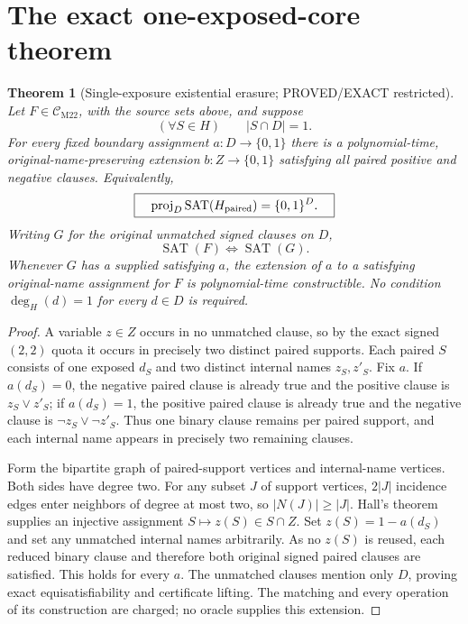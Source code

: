\documentclass[11pt]{article}
\newtheorem{theorem}{Theorem}
\newcommand{\CM}{\mathcal C_{\mathrm{M22}}}
\begin{document}
\section{The exact one-exposed-core theorem}
\begin{theorem}[Single-exposure existential erasure; PROVED/EXACT restricted]
Let $F\in\CM$, with the source sets above, and suppose
\[
(\forall S\in H)\qquad |S\cap D|=1. \tag{E1}
\]
For \emph{every} fixed boundary assignment $a:D\to\{0,1\}$ there is a polynomial-time, original-name-preserving extension $b:Z\to\{0,1\}$ satisfying all paired positive and negative clauses. Equivalently,
\[
\boxed{\quad \operatorname{proj}_{D}\operatorname{SAT}(H_{\rm paired})
             =\{0,1\}^{D}.\quad}
\]
Writing $G$ for the original \emph{unmatched} signed clauses on $D$,
\[
\boxed{\operatorname{SAT}(F)\iff\operatorname{SAT}(G).}
\]
Whenever $G$ has a supplied satisfying $a$, the extension of $a$ to a satisfying original-name assignment for $F$ is polynomial-time constructible. No condition $\deg_H(d)=1$ for every $d\in D$ is required.
\end{theorem}
\begin{proof}
A variable $z\in Z$ occurs in no unmatched clause, so by the exact signed $(2,2)$ quota it occurs in precisely two distinct paired supports. Each paired $S$ consists of one exposed $d_S$ and two distinct internal names $z_S,z'_S$. Fix $a$. If $a(d_S)=0$, the negative paired clause is already true and the positive clause is $z_S\vee z'_S$; if $a(d_S)=1$, the positive paired clause is already true and the negative clause is $\neg z_S\vee\neg z'_S$. Thus one binary clause remains per paired support, and each internal name appears in precisely two remaining clauses.

Form the bipartite graph of paired-support vertices and internal-name vertices. Both sides have degree two. For any subset $J$ of support vertices, $2|J|$ incidence edges enter neighbors of degree at most two, so $|N(J)|\ge |J|$. Hall's theorem supplies an injective assignment $S\mapsto z(S)\in S\cap Z$. Set $z(S)=1-a(d_S)$ and set any unmatched internal names arbitrarily. As no $z(S)$ is reused, each reduced binary clause and therefore both original signed paired clauses are satisfied. This holds for every $a$. The unmatched clauses mention only $D$, proving exact equisatisfiability and certificate lifting. The matching and every operation of its construction are charged; no oracle supplies this extension.
\end{proof}
\end{document}
